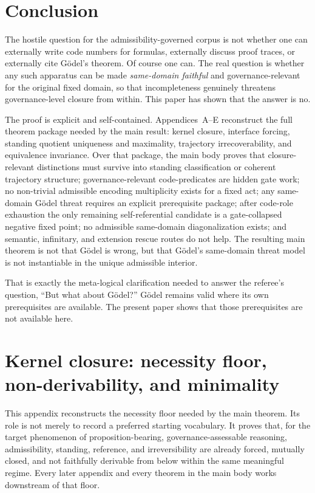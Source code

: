 \documentclass[11pt]{article}
\theoremstyle{plain}
\theoremstyle{definition}
\begin{document}
\section{Conclusion}

The hostile question for the admissibility-governed corpus is not whether one can externally write code numbers for formulas, externally discuss proof traces, or externally cite G\"odel's theorem. Of course one can. The real question is whether any such apparatus can be made \emph{same-domain faithful} and governance-relevant for the original fixed domain, so that incompleteness genuinely threatens governance-level closure from within. This paper has shown that the answer is no.

The proof is explicit and self-contained. Appendices~A--E reconstruct the full theorem package needed by the main result: kernel closure, interface forcing, standing quotient uniqueness and maximality, trajectory irrecoverability, and equivalence invariance. Over that package, the main body proves that closure-relevant distinctions must survive into standing classification or coherent trajectory structure; governance-relevant code-predicates are hidden gate work; no non-trivial admissible encoding multiplicity exists for a fixed act; any same-domain G\"odel threat requires an explicit prerequisite package; after code-role exhaustion the only remaining self-referential candidate is a gate-collapsed negative fixed point; no admissible same-domain diagonalization exists; and semantic, infinitary, and extension rescue routes do not help. The resulting main theorem is not that G\"odel is wrong, but that G\"odel's same-domain threat model is not instantiable in the unique admissible interior.

That is exactly the meta-logical clarification needed to answer the referee's question, ``But what about G\"odel?'' G\"odel remains valid where its own prerequisites are available. The present paper shows that those prerequisites are not available here.

\appendix


\section{Kernel closure: necessity floor, non-derivability, and minimality}
\label{app:kernel}

This appendix reconstructs the necessity floor needed by the main theorem. Its role is not merely to record a preferred starting vocabulary. It proves that, for the target phenomenon of proposition-bearing, governance-assessable reasoning, admissibility, standing, reference, and irreversibility are already forced, mutually closed, and not faithfully derivable from below within the same meaningful regime. Every later appendix and every theorem in the main body works downstream of that floor.
\end{document}
